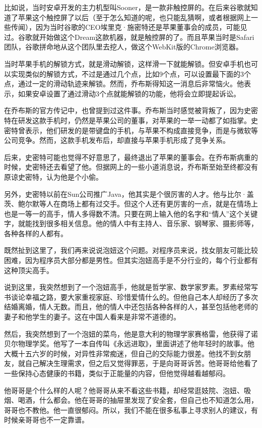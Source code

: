 \documentclass[
  letterpaper,
  DIV=11,
  numbers=noendperiod]{scrreprt}
\begin{document}
比如说，当时安卓开发的主力机型叫Sooner，是一款非触控屏的。在后来谷歌就知道了苹果这个触控屏了以后（至于怎么知道的呢，也只能乱猜啊，或者根据网上一些传闻），因为当时谷歌的CEO埃里克·施密特还是苹果董事会的成员，可能见过。谷歌就开始做这个Dream这款机器，就是触控屏的了。而且苹果当时是Safari团队，谷歌拼命地从这个团队里去挖人，做这个WebKit版的Chrome浏览器。

当时苹果手机的解锁方式，就是滑动解锁，这样滑一下就能解锁。但安卓手机也可以实现类似的解锁方式，不过是通过几个点，比如9个点，可以设置最下面的3个点，通过一定的滑动轨迹来解锁。然而，乔布斯得知这一消息后非常恼火。他表示，如果安卓设置了通过滑动3个点就能解锁的功能，他将会立即提起诉讼。

在乔布斯的官方传记中，也曾提到过这件事。乔布斯当时感觉被背叛了，因为史密特在研发这款手机时，仍然是苹果公司的董事，对苹果的一举一动都了如指掌。史密特曾表示，他们研发的是带键盘的手机，与苹果不构成直接竞争，而是与微软等公司竞争。然而，这款手机发布后，却直接与苹果手机形成了竞争关系。

后来，史密特可能也觉得不好意思了，最终退出了苹果的董事会。在乔布斯病重的时候，史密特还去看望了他。但据网上的一些小道消息说，乔布斯至始至终都没有原谅史密特，认为他是个小偷。

另外，史密特以前在Sun公司推广Java，他其实是个很厉害的人才。他与比尔·盖茨、鲍尔默等人在商场上都有过交手。但这个人还有更厉害的一点，就是在情场上也是一等一的高手，情人多得数不清。只要在网上输入他的名字和``情人''这个关键字，就能找到很多相关信息。他的情人中有主持人、音乐家、钢琴家、摄影师等，各种各样的人都有。

既然扯到这里了，我们再来说说泡妞这个问题。对程序员来说，找女朋友可能比较困难，因为程序员大部分都是男性。但其实泡妞高手是不分行业的，每个行业都有这种顶尖高手。

说到这里，我突然想到了一个泡妞高手，他就是哲学家、数学家罗素。罗素经常写书谈论幸福之路，要大家重视家庭、珍惜爱情什么的。但他自己本人却经历了多次结婚离婚，情人无数。而且，他的情人中还包括各种各样的人，甚至包括他老师的妻子和他学生的妻子。这在中国人看来是非常不道德的。

然后，我突然想到了一个泡妞的菜鸟，他是意大利的物理学家赛格雷，他获得了诺贝尔物理学奖。他写了一本自传叫《永远进取》，里面讲述了他年轻时的故事。他大概十五六岁的时候，对异性非常痴迷，但自己的交际能力很差。他找不到女朋友，就自己解决生理需求，但之后又觉得罪恶，于是向哥哥诉苦。他哥哥给他看了一些保持心态健康的书籍，类似于正能量的内容，但他觉得越看越郁闷。

他哥哥是个什么样的人呢？他哥哥从来不看这些书籍，却经常逛妓院、泡妞、吸烟、喝酒，什么都会。他在哥哥的抽屉里发现了安全套，但自己也不知道怎么用，哥哥也不教他。他一直很郁闷。所以，我们不能在很多私事上寻求别人的建议，有时候亲哥哥也不一定靠谱。
\end{document}
